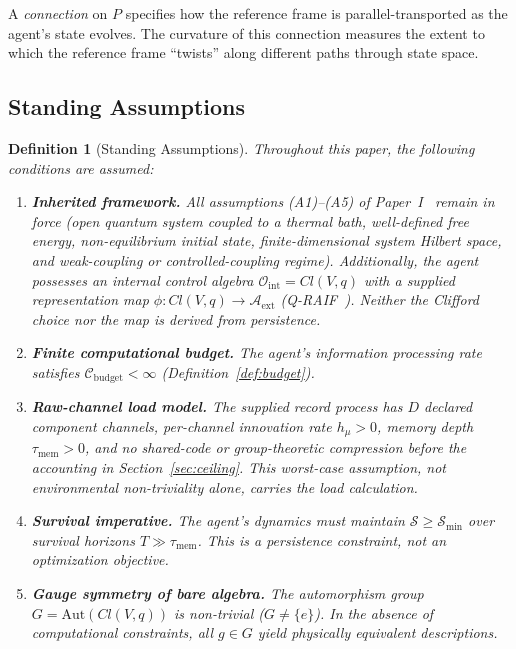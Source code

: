 \documentclass[12pt]{article}
\newtheorem{definition}[theorem]{Definition}
\begin{document}
A \emph{connection} on $P$ specifies how the reference frame
is parallel-transported as the agent's state evolves.
The curvature of this connection measures the extent to
which the reference frame ``twists'' along different paths
through state space.

\subsection{Standing Assumptions}
\label{subsec:standing}

\begin{definition}[Standing Assumptions]
\label{def:assumptions_B}
Throughout this paper, the following conditions are assumed:
\begin{enumerate}
\item[\textup{(B1)}] \textbf{Inherited framework.}
  All assumptions (A1)--(A5) of
  Paper~I~\cite{Liu2026TDOME_I} remain in force
  (open quantum system coupled to a thermal bath,
  well-defined free energy, non-equilibrium initial state,
  finite-dimensional system Hilbert space,
  and weak-coupling or controlled-coupling regime).
  Additionally, the agent possesses an internal control
  algebra $\mathcal{O}_{\mathrm{int}} = Cl(V,q)$
  with a supplied representation map
  $\phi:Cl(V,q)\to\mathcal A_{\mathrm{ext}}$
  (Q-RAIF~\cite{Liu2026QRAIF_C}).  Neither the Clifford choice nor
  the map is derived from persistence.
\item[\textup{(B2)}] \textbf{Finite computational budget.}
  The agent's information processing rate satisfies
  $\mathcal{C}_{\mathrm{budget}} < \infty$
  (Definition~\ref{def:budget}).
\item[\textup{(B3)}] \textbf{Raw-channel load model.}
  The supplied record process has $D$ declared component channels,
  per-channel innovation rate $h_\mu>0$, memory depth
  $\tau_{\mathrm{mem}}>0$, and no shared-code or group-theoretic
  compression before the accounting in Section~\ref{sec:ceiling}.
  This worst-case assumption, not environmental non-triviality alone,
  carries the load calculation.
\item[\textup{(B4)}] \textbf{Survival imperative.}
  The agent's dynamics must maintain
  $\mathcal{S} \geq \mathcal{S}_{\min}$
  over survival horizons
  $T \gg \tau_{\mathrm{mem}}$.
  This is a persistence constraint, not an optimization
  objective.
\item[\textup{(B5)}] \textbf{Gauge symmetry of bare
  algebra.}
  The automorphism group $G = \mathrm{Aut}(Cl(V,q))$
  is non-trivial ($G \neq \{e\}$).
  In the absence of computational constraints, all
  $g \in G$ yield physically equivalent descriptions.
\end{enumerate}
\end{definition}
\end{document}
